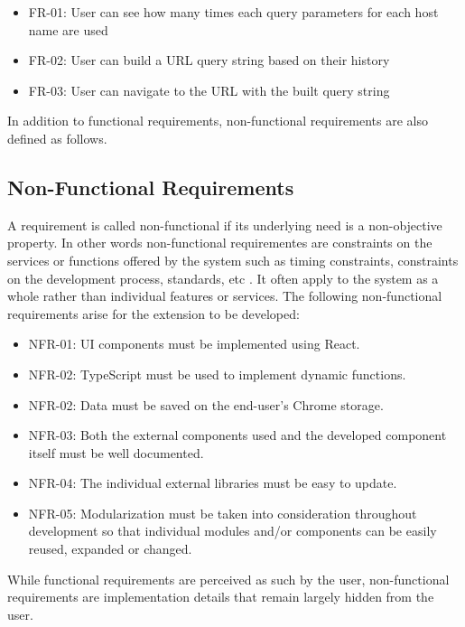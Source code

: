 \begin{itemize}
  \item FR-01: User can see how many times each query parameters for each host name are used
  \item FR-02: User can build a URL query string based on their history
  \item FR-03: User can navigate to the URL with the built query string
\end{itemize}

In addition to functional requirements, non-functional requirements are also defined as follows.

\subsection{Non-Functional Requirements}
A requirement is called non-functional if its underlying need is a non-objective property. In other words non-functional requirementes are constraints on the services or functions offered by the system such as timing constraints, constraints on the development process, standards, etc \autocite{sommerville2011software}. It often apply to the system as a whole rather than individual features or services. The following non-functional requirements arise for the extension to be developed:

\begin{itemize}
  \item NFR-01: UI components must be implemented using React.
  \item NFR-02: TypeScript must be used to implement dynamic functions.
  \item NFR-02: Data must be saved on the end-user's Chrome storage.
  \item NFR-03: Both the external components used and the developed component itself must be well documented.
  \item NFR-04: The individual external libraries must be easy to update.
  \item NFR-05: Modularization must be taken into consideration throughout development so that individual modules and/or components can be easily reused, expanded or changed.
\end{itemize}

While functional requirements are perceived as such by the user, non-functional requirements are implementation details that remain largely hidden from the user.

